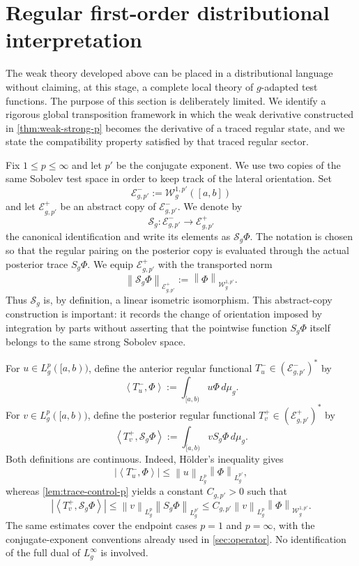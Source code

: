 \documentclass[preprint,12pt]{elsarticle}
\newcommand{\finalrev}[1]{{\color{red}#1}}
\newcommand{\finalrev}[1]{#1}
\theoremstyle{definition}
\theoremstyle{remark}
\newcommand{\norm}[1]{\left\lVert#1\right\rVert}
\newcommand{\abs}[1]{\left\lvert#1\right\rvert}
\newcommand{\ip}[2]{\left\langle#1,#2\right\rangle}
\begin{document}
\section{Regular first-order distributional interpretation}\label{sec:prospective-distributions}

The weak theory developed above can be placed in a distributional language without claiming, at this stage, a complete local theory of $g$-adapted test functions. The purpose of this section is deliberately limited. \finalrev{We identify a rigorous global transposition framework in which the weak derivative constructed in \cref{thm:weak-strong-p} becomes the derivative of a traced regular state, and we state the compatibility property satisfied by that traced regular sector.}

Fix $1\le p\le\infty$ and let $p'$ be the conjugate exponent. We use two copies of the same Sobolev test space in order to keep track of the lateral orientation. Set
\[
 \mathcal E_{g,p'}^-:=\mathcal W_g^{1,p'}([a,b])
\]
and let $\mathcal E_{g,p'}^+$ be an abstract copy of $\mathcal E_{g,p'}^-$. We denote by
\[
 \mathcal S_g:\mathcal E_{g,p'}^-\longrightarrow \mathcal E_{g,p'}^+
\]
the canonical identification and write its elements as $\mathcal S_g\Phi$. The notation is chosen so that the regular pairing on the posterior copy is evaluated through the actual posterior trace $S_g\Phi$. We equip $\mathcal E_{g,p'}^+$ with the transported norm
\[
 \norm{\mathcal S_g\Phi}_{\mathcal E_{g,p'}^+}
 :=\norm{\Phi}_{\mathcal W_g^{1,p'}}.
\]
Thus $\mathcal S_g$ is, by definition, a linear isometric isomorphism. This abstract-copy construction is important: it records the change of orientation imposed by integration by parts without asserting that the pointwise function $S_g\Phi$ itself belongs to the same strong Sobolev space.

For $u\in L_g^p([a,b))$, define the anterior regular functional $T_u^-\in(\mathcal E_{g,p'}^-)^*$ by
\begin{equation}\label{eq:regular-minus-functional}
 \ip{T_u^-}{\Phi}
 :=\int_{[a,b)}u\Phi\,d\mu_g.
\end{equation}
For $v\in L_g^p([a,b))$, define the posterior regular functional $T_v^+\in(\mathcal E_{g,p'}^+)^*$ by
\begin{equation}\label{eq:regular-plus-functional}
 \ip{T_v^+}{\mathcal S_g\Phi}
 :=\int_{[a,b)}vS_g\Phi\,d\mu_g.
\end{equation}
Both definitions are continuous. Indeed, H\"older's inequality gives
\[
 \abs{\ip{T_u^-}{\Phi}}
 \le \norm{u}_{L_g^p}\norm{\Phi}_{L_g^{p'}},
\]
whereas \cref{lem:trace-control-p} yields a constant $C_{g,p'}>0$ such that
\[
 \abs{\ip{T_v^+}{\mathcal S_g\Phi}}
 \le \norm{v}_{L_g^p}\norm{S_g\Phi}_{L_g^{p'}}
 \le C_{g,p'}\norm{v}_{L_g^p}
       \norm{\Phi}_{\mathcal W_g^{1,p'}}.
\]
The same estimates cover the endpoint cases $p=1$ and $p=\infty$, with the conjugate-exponent conventions already used in \cref{sec:operator}. No identification of the full dual of $L_g^\infty$ is involved.
\end{document}
